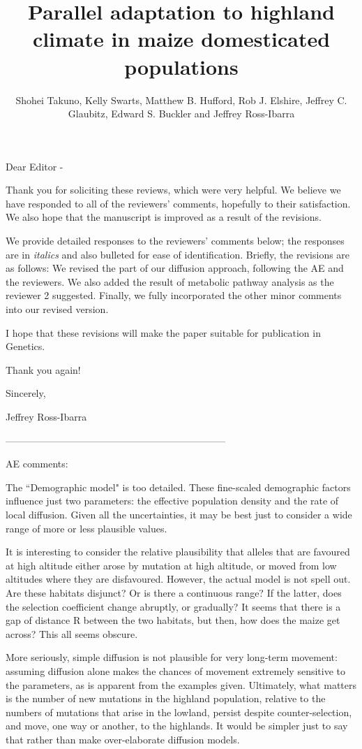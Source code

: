 \documentclass[onecolumn,oneside,letterpaper]{article}
\title{Parallel adaptation to highland climate in maize domesticated populations}
\author{
 Shohei Takuno, Kelly Swarts, Matthew B. Hufford, Rob J. Elshire, Jeffrey C. Glaubitz, Edward S. Buckler and Jeffrey Ross-Ibarra
   }
\begin{document}
\maketitle
Dear Editor - 

Thank you for soliciting these reviews, which were very helpful.   We believe we have responded to all of the reviewers' comments, hopefully to their satisfaction.  We also hope that the manuscript is improved as a result of the revisions.  

We provide detailed responses to the reviewers' comments below; the responses are in \textit{italics} and also bulleted for ease of identification.  
Briefly, the revisions are as follows:  
We revised the part of our diffusion approach, following the AE and the reviewers.  We also added the result of metabolic pathway analysis as the reviewer 2 suggested.  Finally, we fully incorporated the other minor comments into our revised version.  

I hope that these revisions will make the paper suitable for publication in Genetics. 

Thank you again! 

Sincerely, 

Jeffrey Ross-Ibarra

--------------------------------------------------------------------


AE comments: 

The ``Demographic model" is too detailed.  These fine-scaled demographic factors influence just two parameters: the effective population density and the rate of local diffusion.  Given all the uncertainties, it may be best just to consider a wide range of more or less plausible values. 

It is interesting to consider the relative plausibility that alleles that are favoured at high altitude either arose by mutation at high altitude, or moved from low altitudes where they are disfavoured.  However, the actual model is not spell out.  Are these habitats disjunct?  Or is there a continuous range? If the latter, does the selection coefficient change abruptly, or gradually?  It seems that there is a gap of distance R between the two habitats, but then, how does the maize get across?  This all seems obscure. 


More seriously, simple diffusion is not plausible for very long-term movement: assuming diffusion alone makes the chances of movement extremely sensitive to the parameters, as is apparent from the examples given.  Ultimately, what matters is the number of new mutations in the highland population, relative to the numbers of mutations that arise in the lowland, persist despite counter-selection, and move, one way or another, to the highlands.  It would be simpler just to say that rather than make over-elaborate diffusion models. 
\end{document}
